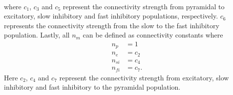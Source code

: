 \begin{align}
\end{align} where $c_{1}$, $c_{3}$ and $c_{5}$ represent the connectivity strength from pyramidal to excitatory, slow inhibitory and fast inhibitory populations, respectively. $c_{6}$ represents the connectivity strength from the slow to the fast inhibitory population. Lastly, all $n_{m}$ can be defined as connectivity constants where\begin{align}%
n_{p} &=1\\
n_{e} &=c_{2}\\
n_{si} &=c_{4}\\
n_{fi} &=c_{7}.
\end{align} Here $c_{2}$, $c_4$ and $c_7$ represent the connectivity strength from excitatory, slow inhibitory and fast inhibitory to the pyramidal population.

